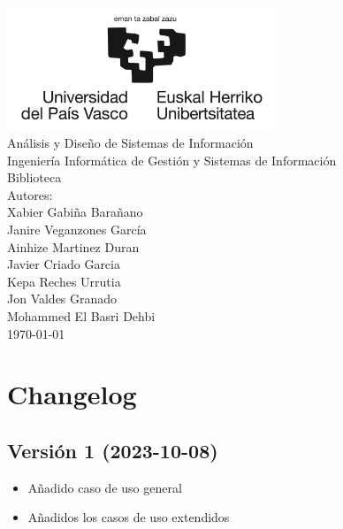 \documentclass{report}
\begin{document}
    \begin{titlepage}
        \centering
        \includegraphics[width=0.6\textwidth]{./img/portada/logo.jpg}\\
        \vspace{1cm}
        \LARGE Análisis y Diseño de Sistemas de Información\\
        \vspace{0.5cm}
        \Large Ingeniería Informática de Gestión y Sistemas de Información\\
        \vspace{3cm}
        \Huge Biblioteca\\
        \vspace{2.5cm}
        \Large Autores:\\
        \vspace{0.2cm}
        \large Xabier Gabiña Barañano\\
        \large Janire Veganzones García\\
        \large Ainhize Martinez Duran\\
        \large Javier Criado Garcia\\
        \large Kepa Reches Urrutia\\
        \large Jon Valdes Granado\\
        \large Mohammed El Basri Dehbi\\
        \vfill
        \today
    \end{titlepage}

    \tableofcontents
    \chapter{Changelog}
        \section{Versión 1 (2023-10-08)}
            \begin{itemize}
                \item Añadido caso de uso general
                \item Añadidos los casos de uso extendidos
            \end{itemize}   
\end{document}
